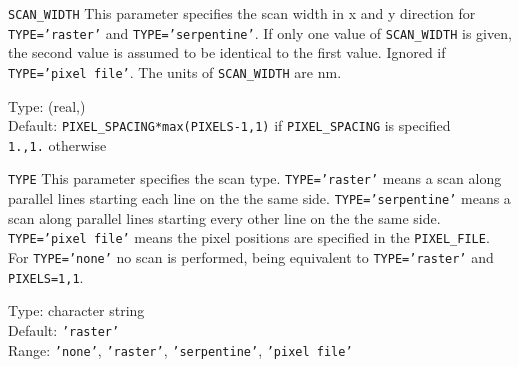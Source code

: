 \begin{keydescription}{\texttt{SCAN\_WIDTH}}
This parameter specifies the scan width in x and y direction for
\texttt{TYPE='raster'} and \texttt{TYPE='serpentine'}. If only one value of
\texttt{SCAN\_WIDTH} is given, the second value is assumed to be identical to
the first value. Ignored if \texttt{TYPE='pixel file'}. The units of
\texttt{SCAN\_WIDTH} are nm.
\begin{keytab}
   Type:    \> (real,) \\
   Default: \> \texttt{PIXEL\_SPACING*max(PIXELS-1,1)} if
               \texttt{PIXEL\_SPACING} is specified \\ 
            \> \texttt{1.,1.} otherwise
\end{keytab}
\end{keydescription}

\begin{keydescription}{\texttt{TYPE}}
This parameter specifies the scan type. \texttt{TYPE='raster'} means a scan
along parallel lines starting each line on the the same side.
\texttt{TYPE='serpentine'} means a scan along parallel lines starting every
other line on the the same side. \texttt{TYPE='pixel file'} means the pixel positions
are specified in the \texttt{PIXEL\_FILE}. For \texttt{TYPE='none'} no scan is
performed, being equivalent to \texttt{TYPE='raster'} and \texttt{PIXELS=1,1}.
\begin{keytab}
   Type:    \> character string \\
   Default: \> \texttt{'raster'} \\
   Range:   \> \texttt{'none'}, \texttt{'raster'}, \texttt{'serpentine'},
               \texttt{'pixel file'}
\end{keytab}
\end{keydescription}

